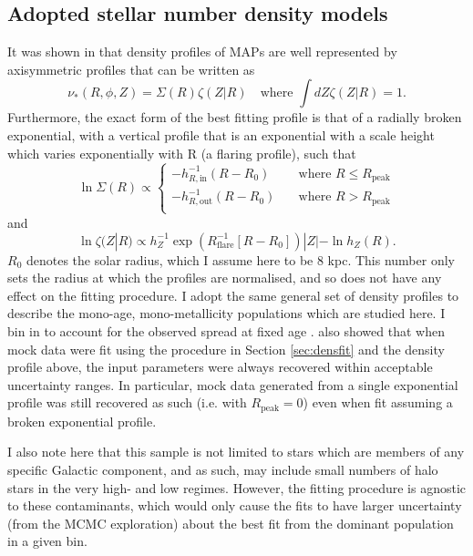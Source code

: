  \subsection{Adopted stellar number density models}
 \label{sec:densitymodel}
 It was shown in \citet{2016ApJ...823...30B} that density profiles of MAPs are well represented by axisymmetric profiles that can be written as 
\begin{equation}
 \nu_*(R, \phi, Z) = \Sigma(R)\zeta(Z|R) \quad \text{where } \int dZ \zeta(Z|R) = 1.
 \end{equation}
 Furthermore, the exact form of the best fitting profile is that of a radially broken exponential, with a vertical profile that is an exponential with a scale height which varies exponentially with R (a flaring profile), such that
 \begin{equation}
 \ln \Sigma(R) \propto  \begin{cases}
     -h_{R,\text{in}}^{-1}(R-R_0)    & \quad \text{where } R \leq R_{\text{peak}}\\
   -h_{R,\text{out}}^{-1}(R-R_0)  &\quad \text{where } R > R_{\text{peak}}\\
   \end{cases}
 \end{equation}
 and
 \begin{equation}
 \ln \zeta(Z|R) \propto h_Z^{-1} \exp{(R_{\mathrm{flare}}^{-1}[R-R_0])} |Z|-\ln{h_Z(R)}.
 \end{equation}
$R_0$ denotes the solar radius, which I assume here to be 8 kpc. This number only sets the radius at which the profiles are normalised, and so does not have any effect on the fitting procedure. I adopt the same general set of density profiles to describe the mono-age, mono-metallicity populations which are studied here. I bin in \feh{} to account for the observed \feh{} spread at fixed age \citep[e.g.][and our Figure \ref{fig:numbins}]{1993A&A...275..101E}. \citet{2016ApJ...823...30B} also showed that when mock data were fit using the procedure in Section \ref{sec:densfit} and the density profile above, the input parameters were always recovered within acceptable uncertainty ranges. In particular, mock data generated from a single exponential profile was still recovered as such (i.e. with $R_{\mathrm{peak}} = 0$) even when fit assuming a broken exponential profile.

I also note here that this sample is not limited to stars which are members of any specific Galactic component, and as such, may include small numbers of halo stars in the very high-\afe{} and low \feh{} regimes. However, the fitting procedure is agnostic to these contaminants, which would only cause the fits to have larger uncertainty (from the MCMC exploration) about the best fit from the dominant population in a given bin.


